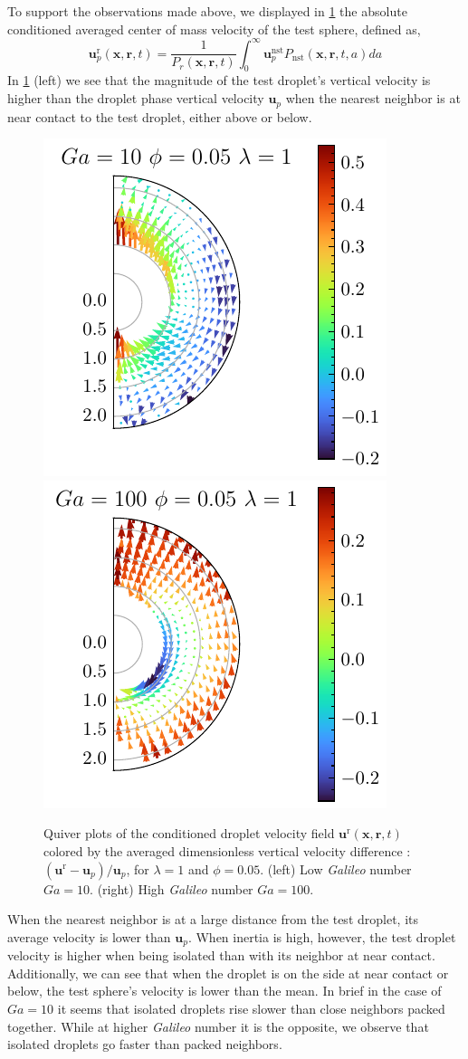 To support the observations made above, we displayed in \ref{fig:unst_ga} the absolute conditioned averaged center of mass velocity of the test sphere, defined as,
\begin{equation*}
    \textbf{u}^\text{r}_p(\textbf{x},\textbf{r},t)  
    =
    \frac{1}{P_r(\textbf{x},\textbf{r},t)}
    \int_0^\infty \textbf{u}^\text{nst}_pP_\text{nst}(\textbf{x},\textbf{r},t,a) da
\end{equation*}
In \ref{fig:unst_ga} (left) we see that the magnitude of the test droplet's vertical velocity is higher than the droplet phase vertical velocity $\textbf{u}_p$ when the nearest neighbor is at near contact to the test droplet, either above or below.
\begin{figure}[h!]
    \centering
    \includegraphics[height=0.35\textwidth]{image/HOMOGENEOUS_NEW/Dist/U_l_1_Ga_10_PHI_5.pdf}
    \includegraphics[height=0.35\textwidth]{image/HOMOGENEOUS_NEW/Dist/U_l_1_Ga_100_PHI_5.pdf}
    \caption{
         Quiver plots of the conditioned droplet velocity field $\textbf{u}^\text{r}(\textbf{x},\textbf{r},t)$ colored by the averaged dimensionless vertical velocity difference : $(\textbf{u}^\text{r} - \textbf{u}_p )/ \textbf{u}_p$, for $\lambda = 1$ and $\phi = 0.05$. 
         (left) Low \textit{Galileo} number $Ga = 10$.
        (right) High \textit{Galileo} number $Ga = 100$.
         }
    \label{fig:unst_ga}
\end{figure}
When the nearest neighbor is at a large distance from the test droplet, its average velocity is lower than $\textbf{u}_p$. 
When inertia is high, however, the test droplet velocity is higher when being isolated than with its neighbor at near contact. 
Additionally, we can see that when the droplet is on the side at near contact or below, the test sphere's velocity  is lower than the mean. 
In brief in the case of $Ga = 10$ it seems that isolated droplets rise slower than close neighbors packed together. 
While at higher \textit{Galileo} number it is the opposite, we observe that isolated droplets go faster than packed neighbors. 


